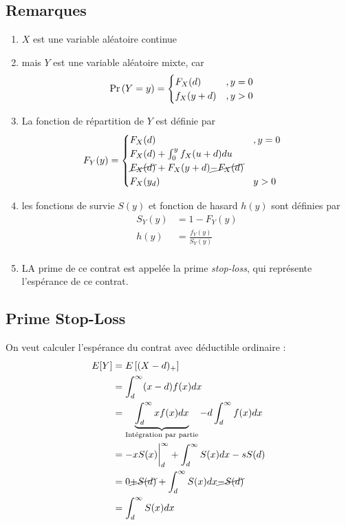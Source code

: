\documentclass[12pt, french]{report}
\begin{document}
\subsection{Remarques}

\begin{enumerate}[label=(\arabic*)]
\item $X$ est une variable aléatoire continue

\item mais $Y$ est une variable aléatoire mixte, car
\begin{align*}
\Pr \left( Y = y \right) & = 
\begin{cases}
F_X(d)	& ,y = 0 \\
f_X(y+d)	& , y > 0 \\
\end{cases}
\end{align*}


\item La fonction de répartition de $Y$ est définie par
\begin{align*}
F_Y(y)	& = 
\begin{cases}
F_X(d)	& , y = 0 \\
F_X(d) + \int_{0}^{y} f_X(u+d) du \\
\cancel{F_X(d)} + F_X(y+d) \cancel{- F_X(d)} \\
F_X(y_d)	& y > 0 \\
\end{cases}
\end{align*}
\item les fonctions de survie $S(y)$ et fonction de hasard $h(y)$ sont définies par
\begin{align*}
S_Y(y) 	& = 1 - F_Y(y) \\
h(y)		& = \frac{f_Y(y)}{S_Y(y)} \\
\end{align*}

\item LA prime de ce contrat est appelée la prime \textit{stop-loss}, qui représente l'espérance de ce contrat.
\end{enumerate}

\subsection{Prime Stop-Loss}
On veut calculer l'espérance du contrat avec déductible ordinaire : 
\begin{align*}
E[Y]		& = E \left[ (X-d)_+ \right] \\
	& = \int_{d}^{\infty} (x-d) f(x) dx \\
	& = \underbrace{\int_{d}^{\infty} x f(x) dx}_{\text{Intégration par partie}} - d \int_{d}^{\infty} f(x) dx \\
	& = -x S(x) \biggr \rvert_d^\infty + \int_{d}^{\infty} S(x) dx  - s S(d) \\
	& = 0  \cancel{+ S(d)} +  \int_{d}^{\infty} S(x) dx  \cancel{- S(d)} \\
	& = \int_{d}^{\infty} S(x) dx \\
\end{align*}
\end{document}
